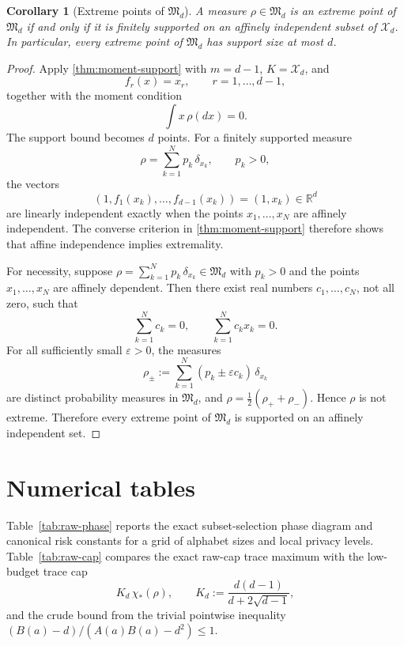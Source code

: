 \documentclass[11pt]{amsart}
\newtheorem{corollary}[corollary]{Corollary}
\theoremstyle{definition}
\newcommand{\R}{\mathbb R}
\newcommand{\cX}{\mathcal X}
\newcommand{\fM}{\mathfrak M}
\begin{document}
\begin{corollary}[Extreme points of $\fM_d$]\label{cor:extreme-Md}
A measure $\rho\in \fM_d$ is an extreme point of $\fM_d$ if and only if it is finitely supported on an affinely independent subset of $\cX_d$. In particular, every extreme point of $\fM_d$ has support size at most $d$.
\end{corollary}

\begin{proof}
Apply \cref{thm:moment-support} with $m=d-1$, $K=\cX_d$, and
\[
f_r(x)=x_r,\qquad r=1,\dots,d-1,
\]
together with the moment condition
\[
\int x\,\rho(dx)=0.
\]
The support bound becomes $d$ points. For a finitely supported measure
\[
\rho=\sum_{k=1}^N p_k\,\delta_{x_k},\qquad p_k>0,
\]
the vectors
\[
(1,f_1(x_k),\dots,f_{d-1}(x_k))=(1,x_k)\in \R^d
\]
are linearly independent exactly when the points $x_1,\dots,x_N$ are affinely independent. The converse criterion in \cref{thm:moment-support} therefore shows that affine independence implies extremality.

For necessity, suppose $\rho=\sum_{k=1}^N p_k\,\delta_{x_k}\in\fM_d$ with $p_k>0$ and the points $x_1,\dots,x_N$ are affinely dependent. Then there exist real numbers $c_1,\dots,c_N$, not all zero, such that
\[
\sum_{k=1}^N c_k=0,\qquad \sum_{k=1}^N c_k x_k=0.
\]
For all sufficiently small $\varepsilon>0$, the measures
\[
\rho_\pm:=\sum_{k=1}^N (p_k\pm\varepsilon c_k)\,\delta_{x_k}
\]
are distinct probability measures in $\fM_d$, and $\rho=\tfrac12(\rho_++\rho_-)$. Hence $\rho$ is not extreme. Therefore every extreme point of $\fM_d$ is supported on an affinely independent set.
\end{proof}


\section{Numerical tables}\label{app:tables}

Table~\ref{tab:raw-phase} reports the exact subset-selection phase diagram and canonical risk constants for a grid of alphabet sizes and local privacy levels. Table~\ref{tab:raw-cap} compares the exact raw-cap trace maximum with the low-budget trace cap
\[
K_d\,\chi_*(\rho),\qquad K_d:=\frac{d(d-1)}{d+2\sqrt{d-1}},
\]
and the crude bound from the trivial pointwise inequality $(B(a)-d)/(A(a)B(a)-d^2)\le 1$.
\end{document}

